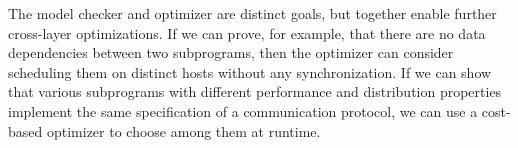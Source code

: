 
The model checker and optimizer are distinct goals, but together enable further cross-layer optimizations.  If we can prove, for example, that
there are no data dependencies between two subprograms, then the optimizer can consider scheduling them on distinct hosts without 
any synchronization.  If we can show that various subprograms with different performance and distribution properties implement the same
specification of a communication protocol, we can use a cost-based optimizer to choose among them at runtime.
